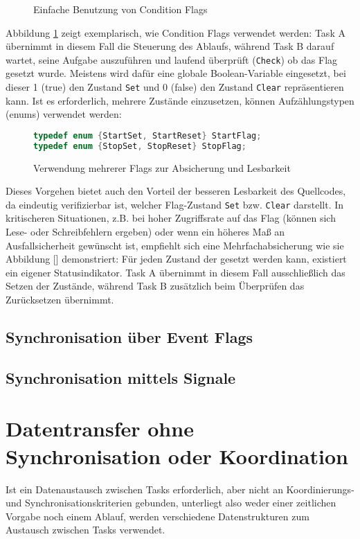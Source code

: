 \documentclass{llncs}
\begin{document}
\begin{figure}
\centering
\def\svgwidth{\columnwidth}

\caption{\label{fig:ConditionFlag} Einfache Benutzung von Condition Flags \autocite[vgl.][83]{Cooling2017}}
\end{figure}
Abbildung \ref{fig:ConditionFlag} zeigt exemplarisch, wie Condition Flags verwendet werden: Task A übernimmt in diesem Fall die Steuerung des Ablaufs, während Task B darauf wartet, seine Aufgabe auszuführen und laufend überprüft (\texttt{Check}) ob das Flag gesetzt wurde. Meistens wird dafür eine globale Boolean-Variable eingesetzt, bei dieser 1 (true) den Zustand \texttt{Set} und 0 (false) den Zustand \texttt{Clear} repräsentieren kann. Ist es erforderlich, mehrere Zustände einzusetzen, können Aufzählungstypen (enums) verwendet werden:
\begin{figure}
	\centering
\begin{lstlisting}[language=C]
typedef enum {StartSet, StartReset} StartFlag;
typedef enum {StopSet, StopReset} StopFlag;
\end{lstlisting}
\caption{\label{fig:ConditionFlagEnums}Verwendung mehrerer Flags zur Absicherung und Lesbarkeit \autocite[vgl.][84-85]{Cooling2017}}
\end{figure}
Dieses Vorgehen bietet auch den Vorteil der besseren Lesbarkeit des Quellcodes, da eindeutig verifizierbar ist, welcher Flag-Zustand \texttt{Set} bzw. \texttt{Clear} darstellt.
In kritischeren Situationen, z.B. bei hoher Zugriffsrate auf das Flag (können sich Lese- oder Schreibfehlern ergeben) oder wenn ein höheres Maß an Ausfallsicherheit gewünscht ist, empfiehlt sich eine Mehrfachabsicherung wie sie Abbildung [] demonstriert: Für jeden Zustand der gesetzt werden kann, existiert ein eigener Statusindikator. Task A übernimmt in diesem Fall ausschließlich das Setzen der Zustände, während Task B zusätzlich beim Überprüfen das Zurücksetzen übernimmt.  
\subsection{Synchronisation über Event Flags}
\subsection{Synchronisation mittels Signale}
\section{Datentransfer ohne Synchronisation oder Koordination}
Ist ein Datenaustausch zwischen Tasks erforderlich, aber nicht an Koordinierungs- und Synchronisationskriterien gebunden, unterliegt also weder einer zeitlichen Vorgabe noch einem Ablauf, werden verschiedene Datenstrukturen zum Austausch zwischen Tasks verwendet.  
\end{document}
